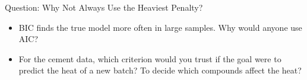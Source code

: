 \begin{frame}{Question: Why Not Always Use the Heaviest Penalty?}
    \begin{itemize}
        \item BIC finds the true model more often in large samples. Why would anyone use AIC?
        \item For the cement data, which criterion would you trust if the goal were to predict the heat of a new batch? To decide which compounds affect the heat?
    \end{itemize}
\end{frame}






